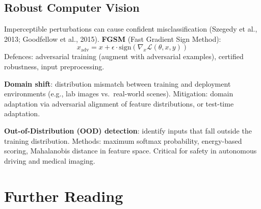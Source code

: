 \subsection{Robust Computer Vision}

\begin{tcbitemize}[ skin=sectionraster ]
    \tcbitem[title={Adversarial Examples}, raster multicolumn=3]
    Imperceptible perturbations can cause confident misclassification (Szegedy et al., 2013; Goodfellow et al., 2015).
    \textbf{FGSM} (Fast Gradient Sign Method):
    \begin{equation}
        x_{\mathrm{adv}} = x + \epsilon \cdot \mathrm{sign}\!\left(\nabla_x \mathcal{L}(\theta, x, y)\right)
    \end{equation}
    Defences: adversarial training (augment with adversarial examples), certified robustness, input preprocessing.

    \tcbitem[title={Domain Shift and OOD Detection}, raster multicolumn=3]
    \textbf{Domain shift}: distribution mismatch between training and deployment environments (e.g., lab images vs.\ real-world scenes).
    Mitigation: domain adaptation via adversarial alignment of feature distributions, or test-time adaptation.

    \textbf{Out-of-Distribution (OOD) detection}: identify inputs that fall outside the training distribution.
    Methods: maximum softmax probability, energy-based scoring, Mahalanobis distance in feature space.
    Critical for safety in autonomous driving and medical imaging.
\end{tcbitemize}


\section{Further Reading}

